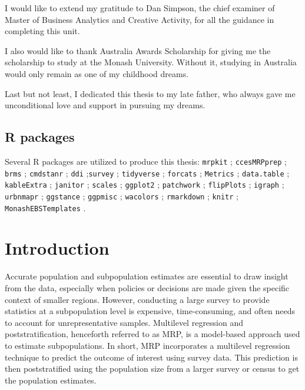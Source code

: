 \documentclass{monashthesis}
\begin{document}
I would like to extend my gratitude to Dan Simpson, the chief examiner of Master of Business Analytics and Creative Activity, for all the guidance in completing this unit.

I also would like to thank Australia Awards Scholarship for giving me the scholarship to study at the Monash University. Without it, studying in Australia would only remain as one of my childhood dreams.

Last but not least, I dedicated this thesis to my late father, who always gave me unconditional love and support in pursuing my dreams.

\hypertarget{r-packages}{%
\section*{R packages}\label{r-packages}}

Several R \autocite{R} packages are utilized to produce this thesis: \texttt{mrpkit} \autocite{mrpkit}; \texttt{ccesMRPprep} \autocite{ccesmrpprep}; \texttt{brms} \autocite{brms}; \texttt{cmdstanr} \autocite{cmdstanr}; \texttt{ddi} \autocite{ddi};\texttt{survey} \autocite{survey}; \texttt{tidyverse} \autocite{tidyverse}; \texttt{forcats} \autocite{forcats}; \texttt{Metrics} \autocite{Metrics}; \texttt{data.table} \autocite{datatable}; \texttt{kableExtra} \autocite{kable}; \texttt{janitor} \autocite{janitor}; \texttt{scales} \autocite{scales}; \texttt{ggplot2} \autocite{ggplot2}; \texttt{patchwork} \autocite{pw}; \texttt{flipPlots} \autocite{flipflops}; \texttt{igraph} \autocite{igraph}; \texttt{urbnmapr} \autocite{urban}; \texttt{ggstance} \autocite{stance}; \texttt{ggpmisc} \autocite{ggpmisc}; \texttt{wacolors} \autocite{wacolors}; \texttt{rmarkdown} \autocite{rmd}; \texttt{knitr} \autocite{knitr}; \texttt{MonashEBSTemplates} \autocite{monashtemp}.

\hypertarget{ch:intro}{%
\chapter{Introduction}\label{ch:intro}}

Accurate population and subpopulation estimates are essential to draw insight from the data, especially when policies or decisions are made given the specific context of smaller regions. However, conducting a large survey to provide statistics at a subpopulation level is expensive, time-consuming, and often needs to account for unrepresentative samples. Multilevel regression and poststratification, henceforth referred to as MRP, is a model-based approach used to estimate subpopulations. In short, MRP incorporates a multilevel regression technique to predict the outcome of interest using survey data. This prediction is then poststratified using the population size from a larger survey or census to get the population estimates.
\end{document}
